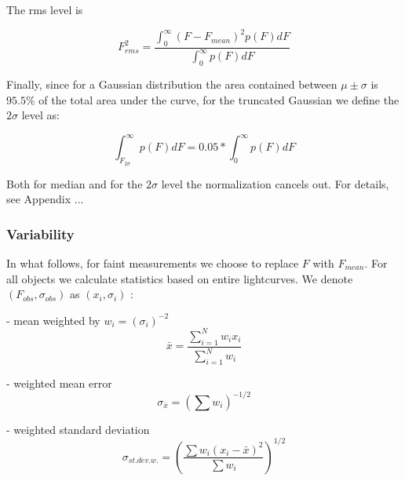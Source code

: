 \documentclass[fleqn,usenatbib]{mnras}  %
\begin{document}
The rms level is

\begin{equation}
F_{rms}^{2} = \frac{\int _{0} ^ {\infty}{(F-F_{mean})^{2} p(F) dF}}{\int _{0} ^ {\infty}{p(F) dF}} 
\end{equation}

Finally, since for a Gaussian distribution the area contained between $\mu \pm \sigma$ is $95.5 \%$ of the total area under the curve, for the truncated Gaussian we define the  $2 \sigma$ level as:

\begin{equation}
\int _{F_{2 \sigma}} ^{\infty} {p(F)dF} = 0.05 * \int _{0} ^{\infty} {p(F) dF} 
\end{equation}

Both for median and for the $2\sigma$ level the normalization cancels out. For details, see Appendix ... 


\subsubsection{Variability}


%
%


%
%
%
%
In what follows, for faint measurements we choose to replace $F$ with $F_{mean}$. For all objects we calculate statistics based on entire lightcurves. We denote $(F_{obs}, \sigma_{obs})$ as $(x_{i},\sigma_{i})$ : 

- mean weighted by  $w_{i} = (\sigma_{i})^{-2}$
\begin{equation}
\bar{x} = \frac{\sum_{i=1}^{N}{w_{i}x_{i}}}{\sum_{i=1}^{N}{w_{i}}}
\end{equation}

- weighted mean error 
\begin{equation}
\sigma_{\bar{x}} = \left( \sum{w_{i}}\right) ^{-1/2} 
\end{equation}

- weighted standard deviation 
\begin{equation}
\sigma_{st.dev.w.} = \left( \frac{\sum{w_{i}(x_{i} - \bar{x})^{2}}}{\sum{w_{i}}} \right) ^ {1/2}
\end{equation}
\end{document}
